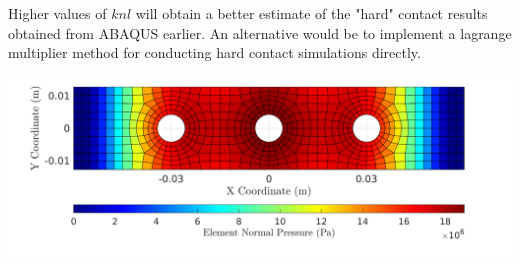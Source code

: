 \documentclass[11pt]{article}
\begin{document}
\begin{enumerate}
Higher values of \(knl\) will obtain a better estimate of the "hard" contact results obtained from ABAQUS earlier.
An alternative would be to implement a lagrange multiplier method for conducting hard contact simulations directly.
\begin{center}
\includegraphics[width=\textwidth]{./figs/intpress.png}
\end{center}
\end{enumerate}
\end{document}
